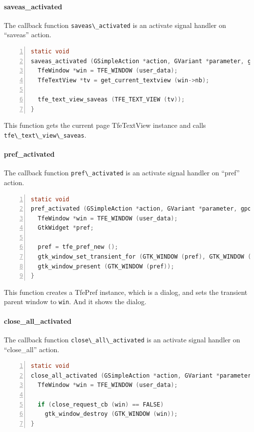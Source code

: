 \paragraph{saveas\_activated}\label{saveas_activated}

The callback function \passthrough{\lstinline!saveas\_activated!} is an
activate signal handler on ``saveas'' action.

\begin{lstlisting}[language=C, numbers=left]
static void
saveas_activated (GSimpleAction *action, GVariant *parameter, gpointer user_data) {
  TfeWindow *win = TFE_WINDOW (user_data);
  TfeTextView *tv = get_current_textview (win->nb);

  tfe_text_view_saveas (TFE_TEXT_VIEW (tv));
}
\end{lstlisting}

This function gets the current page TfeTextView instance and calls
\passthrough{\lstinline!tfe\_text\_view\_saveas!}.

\paragraph{pref\_activated}\label{pref_activated}

The callback function \passthrough{\lstinline!pref\_activated!} is an
activate signal handler on ``pref'' action.

\begin{lstlisting}[language=C, numbers=left]
static void
pref_activated (GSimpleAction *action, GVariant *parameter, gpointer user_data) {
  TfeWindow *win = TFE_WINDOW (user_data);
  GtkWidget *pref;

  pref = tfe_pref_new ();
  gtk_window_set_transient_for (GTK_WINDOW (pref), GTK_WINDOW (win));
  gtk_window_present (GTK_WINDOW (pref));
}
\end{lstlisting}

This function creates a TfePref instance, which is a dialog, and sets
the transient parent window to \passthrough{\lstinline!win!}. And it
shows the dialog.

\paragraph{close\_all\_activated}\label{close_all_activated}

The callback function \passthrough{\lstinline!close\_all\_activated!} is
an activate signal handler on ``close\_all'' action.

\begin{lstlisting}[language=C, numbers=left]
static void
close_all_activated (GSimpleAction *action, GVariant *parameter, gpointer user_data) {
  TfeWindow *win = TFE_WINDOW (user_data);

  if (close_request_cb (win) == FALSE)
    gtk_window_destroy (GTK_WINDOW (win));
}
\end{lstlisting}


